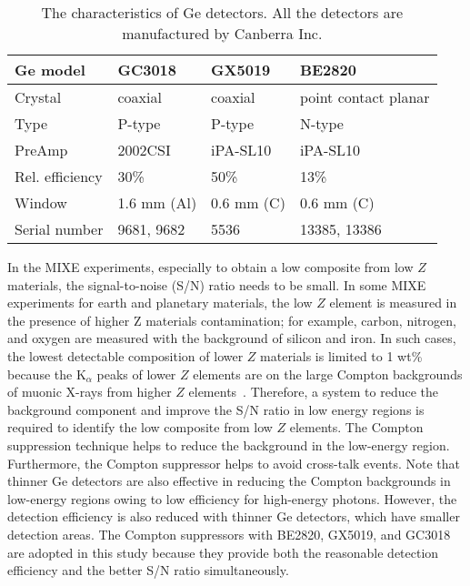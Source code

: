 \begin{table}%
  \caption{The characteristics of Ge detectors. All the detectors are manufactured by Canberra Inc.}
  \label{tab:Ge-character}
 \begin{tabular*}{\tblwidth}{@{} llll@{} }
  \toprule
  Ge model         & GC3018      & GX5019     & BE2820 \\
  \midrule
  Crystal          & coaxial     & coaxial    & point contact planar \\
  Type             & P-type      & P-type     & N-type \\
  PreAmp           & 2002CSI     & iPA-SL10   & iPA-SL10 \\
  Rel. efficiency  & 30\%        & 50\%       & 13\% \\ 
  Window           & 1.6 mm (Al) & 0.6 mm (C) & 0.6 mm (C) \\
  Serial number    & 9681, 9682  & 5536       & 13385, 13386\\
  \bottomrule
  \end{tabular*}
\end{table}

In the MIXE experiments, especially to obtain a low composite from low $Z$ materials, the signal-to-noise (S/N) ratio needs to be small. 
In some MIXE experiments for earth and planetary materials, the low $Z$ element is measured in the presence of higher Z materials contamination; 
for example, carbon, nitrogen, and oxygen are measured with the background of silicon and iron. 
In such cases, the lowest detectable composition of lower $Z$ materials is limited to 1 wt\% because the K$_\alpha$ peaks of lower $Z$ elements are on the large Compton backgrounds of muonic X-rays from higher $Z$ elements~\cite{Terada2014-cw}. 
Therefore, a system to reduce the background component and improve the S/N ratio in low energy regions is required to identify the low composite from low $Z$ elements. %
The Compton suppression technique helps to reduce the background in the low-energy region.
Furthermore, the Compton suppressor helps to avoid cross-talk events. 
Note that thinner Ge detectors are also effective in reducing the Compton backgrounds in low-energy regions owing to low efficiency for high-energy photons. However, the detection efficiency is also reduced with thinner Ge detectors, which have smaller detection areas. The Compton suppressors with BE2820, GX5019, and GC3018 are adopted in this study because they provide both the reasonable detection efficiency and the better S/N ratio simultaneously.


